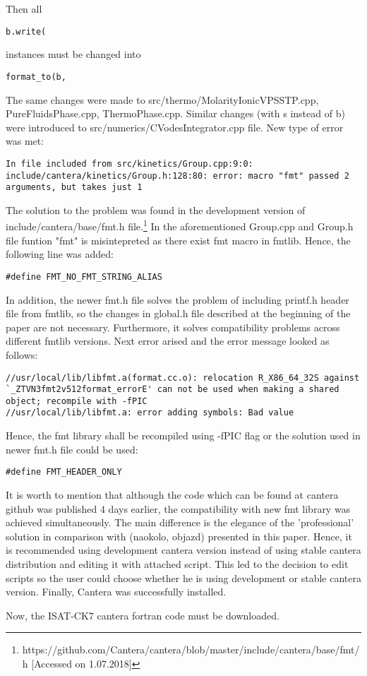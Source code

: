\documentclass[12pt,english]{article}
\begin{document}
Then all 
\begin{lstlisting}
b.write(
\end{lstlisting} 
instances must be changed into 
\begin{lstlisting}
format_to(b,
\end{lstlisting} 
The same changes were made to src/thermo/MolarityIonicVPSSTP.cpp, PureFluidsPhase.cpp, ThermoPhase.cpp. Similar changes (with s instead of b) were introduced to src/numerics/CVodesIntegrator.cpp file.
New type of error was met:
\begin{lstlisting}
In file included from src/kinetics/Group.cpp:9:0:
include/cantera/kinetics/Group.h:128:80: error: macro "fmt" passed 2 arguments, but takes just 1
\end{lstlisting}
The solution to the problem was found in the development version of include/cantera/base/fmt.h file.\footnote{https://github.com/Cantera/cantera/blob/master/include/cantera/base/fmt/h [Accessed on 1.07.2018]} In the aforementioned Group.cpp and Group.h file funtion "fmt" is misintepreted as there exist fmt macro in fmtlib. Hence, the following line was added:
\begin{lstlisting}
#define FMT_NO_FMT_STRING_ALIAS
\end{lstlisting}
In addition, the newer fmt.h file solves the problem of including printf.h header file from fmtlib, so the changes in global.h file described at the beginning of the paper are not necessary. Furthermore, it solves compatibility problems across different fmtlib versions.
Next error arised and the error message looked as follows:
\begin{lstlisting}
//usr/local/lib/libfmt.a(format.cc.o): relocation R_X86_64_32S against `_ZTVN3fmt2v512format_errorE' can not be used when making a shared object; recompile with -fPIC
//usr/local/lib/libfmt.a: error adding symbols: Bad value
\end{lstlisting}
Hence, the fmt library shall be recompiled using -fPIC flag or the solution used in newer fmt.h file could be used:
\begin{lstlisting}
#define FMT_HEADER_ONLY
\end{lstlisting}
It is worth to mention that although the code which can be found at cantera github was published 4 days earlier, the compatibility with new fmt library was achieved simultaneously. The main difference is the elegance of the 'professional' solution in comparison with (naokolo, objazd) presented in this paper. Hence, it is recommended using development cantera version instead of using stable cantera distribution and editing it with attached script. This led to the decision to edit scripts so the user could choose whether he is using development or stable cantera version. Finally, Cantera was successfully installed.

Now, the ISAT-CK7 cantera fortran code must be downloaded.
	
\end{document}

